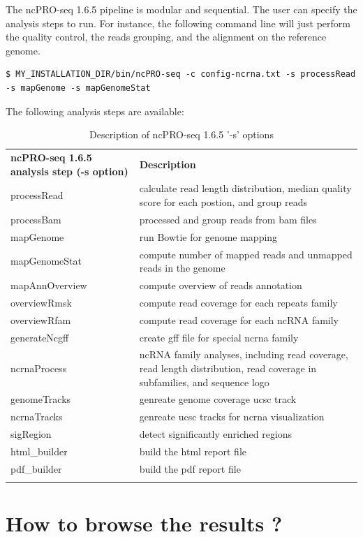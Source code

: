 \documentclass[12pt]{article}
\def \ncpip{ncPRO-seq 1.6.5}
\begin{document}
The \ncpip{} pipeline is modular and sequential. The user can specify the analysis steps to run.
For instance, the following command line will just perform the quality control, the reads grouping, and the alignment on the reference genome.
\begin{verbatim}
$ MY_INSTALLATION_DIR/bin/ncPRO-seq -c config-ncrna.txt -s processRead 
-s mapGenome -s mapGenomeStat 
\end{verbatim}
The following analysis steps are available:
\begin{center}
\begin{longtable}{|p{8cm}|p{8cm}|}
\hline \rowcolor{gray} 
\textbf{\ncpip{} analysis step (-s option)} &	\textbf{Description}\tabularnewline 
processRead &	calculate read length distribution, median quality score for each postion, and group reads\\
processBam &	processed and group reads from bam files\\
mapGenome &	run Bowtie for genome mapping\\
mapGenomeStat&	compute number of mapped reads and unmapped reads in the genome\\
mapAnnOverview & compute overview of reads annotation\\
overviewRmsk &	compute read coverage for each repeats family\\
overviewRfam &	compute read coverage for each ncRNA family\\
generateNcgff &	create gff file for special ncrna family\\
ncrnaProcess&	ncRNA family analyses, including read coverage, read length distribution, read coverage in subfamilies, and sequence logo\\
genomeTracks & genreate genome coverage ucsc track\\
ncrnaTracks & genreate ucsc tracks for ncrna visualization\\
sigRegion &	detect significantly enriched regions\\
html\_builder &	build the html report file\\
pdf\_builder & build the pdf report file\\
\hline
\caption{Description of \ncpip{} '-s' options}
\label{tab:configureoptions}
\end{longtable}
\end{center}

\section{How to browse the results ?}
\label{section:report}
\end{document}
